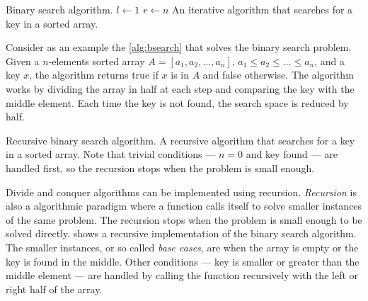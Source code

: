 \begin{algobox}[label=alg:bsearch]{Binary search algorithm.}
  $l \gets 1$\;
  $r \gets n$\;
  \tcblower
  An iterative algorithm that searches for a key in a sorted array.
\end{algobox}

Consider as an example the \cref{alg:bsearch} that solves the binary search problem.  Given a
$n$-elements sorted array $A = \left[a_1, a_2, \dots, a_n\right]$, $a_1 \leq a_2 \leq
\dots \leq a_n$, and a key $x$, the algorithm returns true if $x$ is in $A$ and false
otherwise.  The algorithm works by dividing the array in half at each step and comparing
the key with the middle element.  Each time the key is not found, the search space is
reduced by half.

\begin{algobox}[label=alg:bsearch2]{Recursive binary search algorithm.}
  \tcblower
  A recursive algorithm that searches for a key in a sorted array.  Note that trivial
  conditions --- $n = 0$ and key found --- are handled first, so the recursion stops
  when the problem is small enough.
\end{algobox}

Divide and conquer algorithms can be implemented using recursion.  \emph{Recursion}
is also a algorithmic paradigm where a function calls itself to solve smaller instances of the
same problem.  The recursion stops when the problem is small enough to be solved directly.
 shows a recursive implementation of the binary search algorithm.
The smaller instances, or so called \emph{base cases}, are when the array is empty or the key
is found in the middle.  Other conditions --- key is smaller or greater than the middle element ---
are handled by calling the function recursively with the left or right half of the array.

